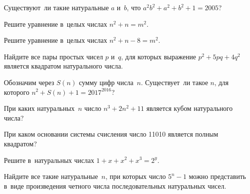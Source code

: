 


\begin{problems}

\item
Существуют~ли такие натуральные $a$ и~$b$, что
$a^2 b^2 + a^2 + b^2 + 1 = 2005$?

\item
Решите уравнение в~целых числах $n^2 + n = m^2$.

\item
Решите уравнение в~целых числах $n^2 + n - 8 = m^2$.

\item
Найдите все пары простых чисел $p$ и~$q$, для которых
выражение $p^2 + 5 p q + 4 q^2$ является квадратом натурального числа.

\item
Обозначим через $S(n)$ сумму цифр числа~$n$.
Существует~ли такое $n$, для которого $n^2 + S(n) + 1 = 2017^{2016}$?

\item
При каких натуральных~$n$ число $n^3 + 2 n^2 + 11$ является кубом натурального
числа?

\item
При каком основании системы счисления число 11010 является полным квадратом?

\item
Решите в~натуральных числах $1 + x + x^2 + x^3 = 2^y$.


\item
Найдите все такие натуральные~$n$, при которых число $5^{n} - 1$ можно
представить в~виде произведения четного числа последовательных натуральных
чисел.

\end{problems}

